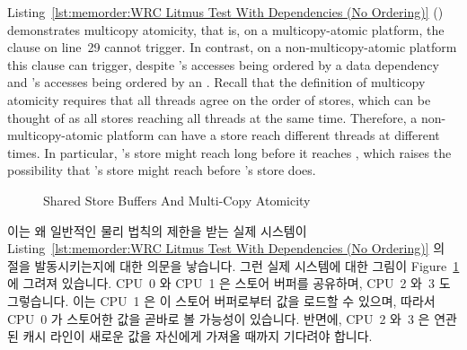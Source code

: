 Listing~\ref{lst:memorder:WRC Litmus Test With Dependencies (No Ordering)}
()
demonstrates multicopy atomicity, that is, on a multicopy-atomic platform,
the  clause on line~29 cannot trigger.
In contrast, on a non-multicopy-atomic
platform this  clause can trigger, despite
's accesses being ordered by a data dependency and 's
accesses being ordered by an .
Recall that the definition of multicopy atomicity requires that all
threads agree on the order of stores, which can be thought of as
all stores reaching all threads at the same time.
Therefore, a non-multicopy-atomic platform can have a store reach
different threads at different times.
In particular, 's store might reach  long before it
reaches , which raises the possibility that 's store
might reach  before 's store does.
\fi

\begin{figure}[tb]
\centering
{}
\caption{Shared Store Buffers And Multi-Copy Atomicity}
\label{fig:memorder:Shared Store Buffers And Multi-Copy Atomicity}
\end{figure}

이는 왜 일반적인 물리 법칙의 제한을 받는 실제 시스템이
Listing~\ref{lst:memorder:WRC Litmus Test With Dependencies (No Ordering)}
의  절을 발동시키는지에 대한 의문을 낳습니다.
그런 실제 시스템에 대한 그림이
Figure~\ref{fig:memorder:Shared Store Buffers And Multi-Copy Atomicity} 에
그려져 있습니다.
CPU~0 와 CPU~1 은 스토어 버퍼를 공유하며, CPU~2 와~3 도 그렇습니다.
이는 CPU~1 은 이 스토어 버퍼로부터 값을 로드할 수 있으며, 따라서 CPU~0 가
스토어한 값을 곧바로 볼 가능성이 있습니다.
반면에, CPU~2 와~3 은 연관된 캐시 라인이 새로운 값을 자신에게 가져올 때까지
기다려야 합니다.

